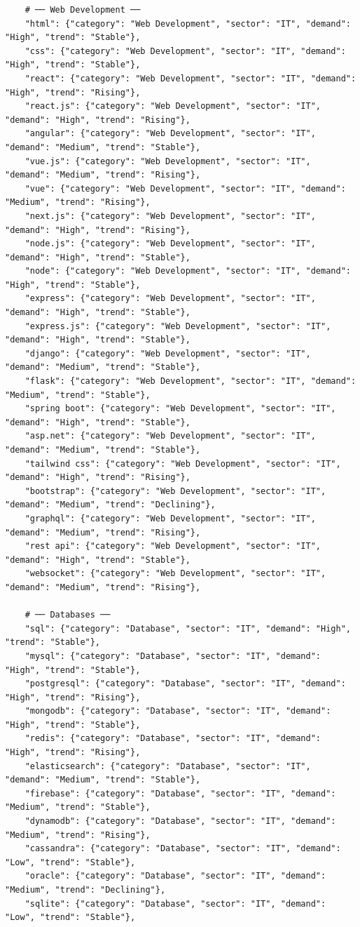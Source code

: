 \documentclass[12pt,a4paper]{report}
\begin{document}
\begin{verbatim}
    # ── Web Development ──
    "html": {"category": "Web Development", "sector": "IT", "demand": "High", "trend": "Stable"},
    "css": {"category": "Web Development", "sector": "IT", "demand": "High", "trend": "Stable"},
    "react": {"category": "Web Development", "sector": "IT", "demand": "High", "trend": "Rising"},
    "react.js": {"category": "Web Development", "sector": "IT", "demand": "High", "trend": "Rising"},
    "angular": {"category": "Web Development", "sector": "IT", "demand": "Medium", "trend": "Stable"},
    "vue.js": {"category": "Web Development", "sector": "IT", "demand": "Medium", "trend": "Rising"},
    "vue": {"category": "Web Development", "sector": "IT", "demand": "Medium", "trend": "Rising"},
    "next.js": {"category": "Web Development", "sector": "IT", "demand": "High", "trend": "Rising"},
    "node.js": {"category": "Web Development", "sector": "IT", "demand": "High", "trend": "Stable"},
    "node": {"category": "Web Development", "sector": "IT", "demand": "High", "trend": "Stable"},
    "express": {"category": "Web Development", "sector": "IT", "demand": "High", "trend": "Stable"},
    "express.js": {"category": "Web Development", "sector": "IT", "demand": "High", "trend": "Stable"},
    "django": {"category": "Web Development", "sector": "IT", "demand": "Medium", "trend": "Stable"},
    "flask": {"category": "Web Development", "sector": "IT", "demand": "Medium", "trend": "Stable"},
    "spring boot": {"category": "Web Development", "sector": "IT", "demand": "High", "trend": "Stable"},
    "asp.net": {"category": "Web Development", "sector": "IT", "demand": "Medium", "trend": "Stable"},
    "tailwind css": {"category": "Web Development", "sector": "IT", "demand": "High", "trend": "Rising"},
    "bootstrap": {"category": "Web Development", "sector": "IT", "demand": "Medium", "trend": "Declining"},
    "graphql": {"category": "Web Development", "sector": "IT", "demand": "Medium", "trend": "Rising"},
    "rest api": {"category": "Web Development", "sector": "IT", "demand": "High", "trend": "Stable"},
    "websocket": {"category": "Web Development", "sector": "IT", "demand": "Medium", "trend": "Rising"},

    # ── Databases ──
    "sql": {"category": "Database", "sector": "IT", "demand": "High", "trend": "Stable"},
    "mysql": {"category": "Database", "sector": "IT", "demand": "High", "trend": "Stable"},
    "postgresql": {"category": "Database", "sector": "IT", "demand": "High", "trend": "Rising"},
    "mongodb": {"category": "Database", "sector": "IT", "demand": "High", "trend": "Stable"},
    "redis": {"category": "Database", "sector": "IT", "demand": "High", "trend": "Rising"},
    "elasticsearch": {"category": "Database", "sector": "IT", "demand": "Medium", "trend": "Stable"},
    "firebase": {"category": "Database", "sector": "IT", "demand": "Medium", "trend": "Stable"},
    "dynamodb": {"category": "Database", "sector": "IT", "demand": "Medium", "trend": "Rising"},
    "cassandra": {"category": "Database", "sector": "IT", "demand": "Low", "trend": "Stable"},
    "oracle": {"category": "Database", "sector": "IT", "demand": "Medium", "trend": "Declining"},
    "sqlite": {"category": "Database", "sector": "IT", "demand": "Low", "trend": "Stable"},


\end{verbatim}
\end{document}
